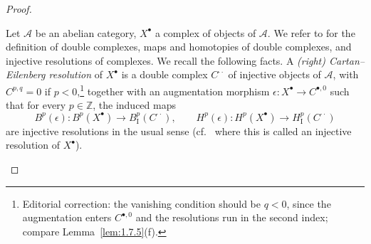 \begin{proof}
\begin{definition*}
Let $\mathcal{A}$ be an abelian category, $X^\bullet$ a complex of objects of $\mathcal{A}$. We refer to \cite[\nopp Ch.~IV, \S4]{M} for the definition of double complexes, maps and homotopies of double complexes, and injective resolutions of complexes. We recall the following facts.
 A \emph{(right) Cartan--Eilenberg resolution} of $X^\bullet$ is a double complex $C^{\cdot\cdot}$ of injective objects of $\mathcal{A}$, with $C^{p,q}=0$ if $p<0$,\footnote{Editorial correction: the vanishing condition should be $q<0$, since the augmentation enters $C^{\bullet,0}$ and the resolutions run in the second index; compare Lemma~\ref{lem:1.7.5}(f).} together with an augmentation morphism $\epsilon\colon X^\bullet\to C^{\bullet,0}$ such that for every $p\in\mathbb{Z}$, the induced maps
\[
B^p(\epsilon)\colon B^p(X^\bullet) \to B^p_{\mathrm{I}}(C^{\cdot\cdot}),\qquad
H^p(\epsilon)\colon H^p(X^\bullet) \to H^p_{\mathrm{I}}(C^{\cdot\cdot})
\]
are injective resolutions in the usual sense (cf.\ \cite[\nopp Ch.~XVII, \S1]{M} where this is called an injective resolution of $X^\bullet$).
\end{definition*}


\end{proof}
